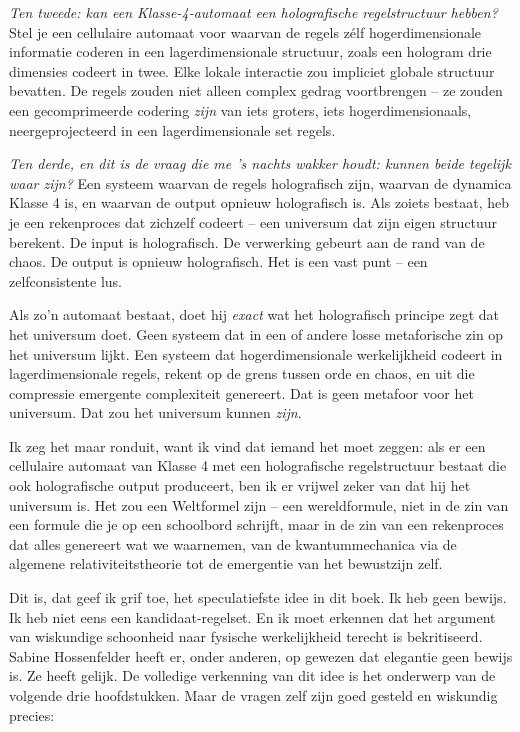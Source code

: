 \documentclass[11pt, twoside, openright]{book}
\begin{document}
\textit{Ten tweede: kan een Klasse-4-automaat een holografische regelstructuur hebben?} Stel je een cellulaire automaat voor waarvan de regels zélf hogerdimensionale informatie coderen in een lagerdimensionale structuur, zoals een hologram drie dimensies codeert in twee. Elke lokale interactie zou impliciet globale structuur bevatten. De regels zouden niet alleen complex gedrag voortbrengen -- ze zouden een gecomprimeerde codering \textit{zijn} van iets groters, iets hogerdimensionaals, neergeprojecteerd in een lagerdimensionale set regels.

\textit{Ten derde, en dit is de vraag die me 's nachts wakker houdt: kunnen beide tegelijk waar zijn?} Een systeem waarvan de regels holografisch zijn, waarvan de dynamica Klasse 4 is, en waarvan de output opnieuw holografisch is. Als zoiets bestaat, heb je een rekenproces dat zichzelf codeert -- een universum dat zijn eigen structuur berekent. De input is holografisch. De verwerking gebeurt aan de rand van de chaos. De output is opnieuw holografisch. Het is een vast punt -- een zelfconsistente lus.

Als zo'n automaat bestaat, doet hij \textit{exact} wat het holografisch principe zegt dat het universum doet. Geen systeem dat in een of andere losse metaforische zin op het universum lijkt. Een systeem dat hogerdimensionale werkelijkheid codeert in lagerdimensionale regels, rekent op de grens tussen orde en chaos, en uit die compressie emergente complexiteit genereert. Dat is geen metafoor voor het universum. Dat zou het universum kunnen \textit{zijn}.

Ik zeg het maar ronduit, want ik vind dat iemand het moet zeggen: als er een cellulaire automaat van Klasse 4 met een holografische regelstructuur bestaat die ook holografische output produceert, ben ik er vrijwel zeker van dat hij het universum is. Het zou een Weltformel zijn -- een wereldformule, niet in de zin van een formule die je op een schoolbord schrijft, maar in de zin van een rekenproces dat alles genereert wat we waarnemen, van de kwantummechanica via de algemene relativiteitstheorie tot de emergentie van het bewustzijn zelf.

Dit is, dat geef ik grif toe, het speculatiefste idee in dit boek. Ik heb geen bewijs. Ik heb niet eens een kandidaat-regelset. En ik moet erkennen dat het argument van wiskundige schoonheid naar fysische werkelijkheid terecht is bekritiseerd. Sabine Hossenfelder heeft er, onder anderen, op gewezen dat elegantie geen bewijs is. Ze heeft gelijk. De volledige verkenning van dit idee is het onderwerp van de volgende drie hoofdstukken. Maar de vragen zelf zijn goed gesteld en wiskundig precies:
\end{document}

